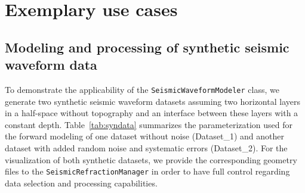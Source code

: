 \documentclass[a4paper,fleqn]{cas-sc}
\begin{document}
\section{Exemplary use cases}

\subsection{Modeling and processing of synthetic seismic waveform data}

To demonstrate the applicability of the \texttt{SeismicWaveformModeler} class, we generate two synthetic seismic waveform datasets assuming two horizontal layers in a half-space without topography and an interface between these layers with a constant depth.
Table~\ref{tab:syndata} summarizes the parameterization used for the forward modeling of one dataset without noise (Dataset\_1) and another dataset with added random noise and systematic errors (Dataset\_2).
For the visualization of both synthetic datasets, we provide the corresponding geometry files to the \texttt{SeismicRefractionManager} in order to have full control regarding data selection and processing capabilities. 
\end{document}
